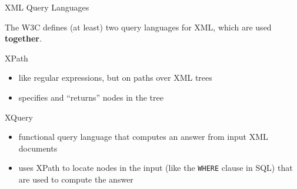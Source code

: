 
\begin{frame}{XML Query Languages}

The W3C defines (at least) two query languages for XML, which are used \textbf{together}. 

\begin{BOX}{XPath}
\begin{itemize}[-,noitemsep]
\item like regular expressions, but on paths over XML trees
\item specifies and ``returns'' nodes in the tree
\end{itemize}
\end{BOX}

\begin{BOX}{XQuery}
\begin{itemize}[-,noitemsep]
\item functional query language that computes an answer from input XML documents
\item uses XPath to locate nodes in the input (like the \lstinline{WHERE} clause in SQL) that are used to compute the answer
\end{itemize}
\end{BOX}

\end{frame}


